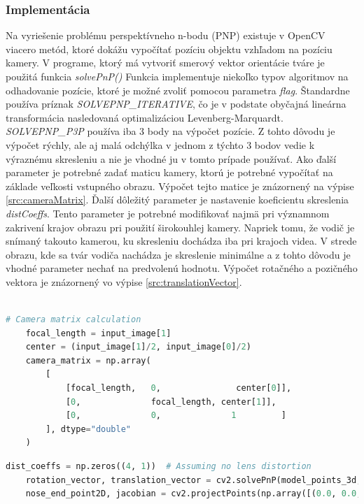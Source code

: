 \documentclass[slovak,master,dept460,male,cpp,cpdeclaration]{diploma}
\begin{document}
\subsubsection*{Implementácia}
Na vyriešenie problému perspektívneho n-bodu (PNP) existuje v OpenCV viacero metód, ktoré dokážu vypočítať  pozíciu objektu vzhľadom na pozíciu kamery. V programe, ktorý má vytvoriť smerový vektor orientácie tváre  je použitá funkcia \textit{solvePnP()} Funkcia implementuje niekoľko typov algoritmov na odhadovanie pozície, ktoré je možné zvoliť pomocou parametra \textit{flag}. Štandardne používa príznak \textit{SOLVEPNP\_ITERATIVE}, čo je v podstate obyčajná lineárna transformácia nasledovaná optimalizáciou Levenberg-Marquardt. \textit{SOLVEPNP\_P3P} používa iba 3 body na výpočet pozície. Z tohto dôvodu je výpočet rýchly, ale  aj malá odchýlka  v jednom z týchto 3 bodov vedie k výraznému skresleniu a nie je vhodné ju v tomto prípade používať.  Ako ďalší parameter je potrebné  zadať  maticu kamery, ktorú je potrebné vypočítať na základe veľkosti vstupného obrazu. Výpočet tejto matice je znázornený na výpise \ref{src:cameraMatrix}. Ďalší dôležitý parameter je nastavenie koeficientu skreslenia \textit{distCoeffs}. Tento parameter je potrebné modifikovať najmä pri významnom zakrivení krajov obrazu pri použití širokouhlej kamery. Napriek tomu, že vodič je snímaný  takouto kamerou, ku skresleniu dochádza iba pri krajoch videa. V strede obrazu, kde sa tvár vodiča nachádza je skreslenie minimálne a z tohto dôvodu je vhodné parameter nechať na predvolenú hodnotu. Výpočet rotačného a pozičného vektora je znázornený vo výpise \ref{src:translationVector}.
\\\\
\begin{lstlisting}[language=Python,label=src:cameraMatrix,caption={Výpočet  matice kamery}]
    # Camera matrix calculation
    focal_length = input_image[1]
    center = (input_image[1]/2, input_image[0]/2)
    camera_matrix = np.array(
        [
            [focal_length,   0,               center[0]],
            [0,              focal_length, center[1]],
            [0,              0,              1         ]
        ], dtype="double"
    )
\end{lstlisting}

\newpage
\begin{lstlisting}[language=Python,label=src:translationVector,caption={rotačného a pozičného vektora}]
    dist_coeffs = np.zeros((4, 1))  # Assuming no lens distortion
    rotation_vector, translation_vector = cv2.solvePnP(model_points_3d, image_points, camera_matrix, dist_coeffs, flags=cv2.SOLVEPNP_ITERATIVE)
    nose_end_point2D, jacobian = cv2.projectPoints(np.array([(0.0, 0.0, 1000.0)]), rotation_vector, translation_vector, camera_matrix, dist_coeffs)
\end{lstlisting}
\end{document}

